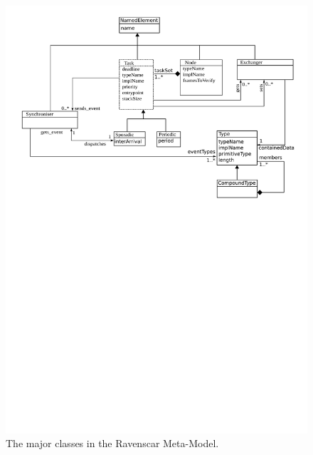 \begin{figure}
\centering
\includegraphics[scale=0.6]{figs/tasking_config}
\caption{The major classes in the Ravenscar Meta-Model.}
\label{fig:tasking_config}
\end{figure}

